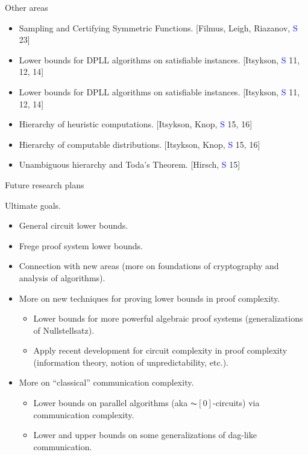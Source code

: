 \begin{frame}{Other areas}

    \begin{itemize}
        \item Sampling and Certifying Symmetric Functions. [Filmus, Leigh, Riazanov, \textcolor{blue}{S} 23]
        \item Lower bounds for DPLL algorithms on satisfiable instances. [Itsykson, \textcolor{blue}{S} 11, 12, 14]
        \item Lower bounds for DPLL algorithms on satisfiable instances. [Itsykson, \textcolor{blue}{S} 11, 12, 14]
        \item Hierarchy of heuristic computations. [Itsykson, Knop, \textcolor{blue}{S} 15, 16]
        \item Hierarchy of computable distributions. [Itsykson, Knop, \textcolor{blue}{S} 15, 16]
        \item Unambiguous hierarchy and Toda's Theorem. [Hirsch, \textcolor{blue}{S} 15]
    \end{itemize}
    
\end{frame}


\begin{frame}{Future research plans}

    Ultimate goals.
    \begin{itemize}
        \item General circuit lower bounds.
        \item Frege proof system lower bounds.
        \item Connection with new areas (more on foundations of cryptography and analysis of algorithms).
    \end{itemize}

    \pause
    \begin{itemize}
        \item More on new techniques for proving lower bounds in proof complexity.
            \begin{itemize}
                \item Lower bounds for more powerful algebraic proof systems (generalizations of
                    Nullstellsatz).
                \item Apply recent development for circuit complexity in proof complexity (information
                    theory, notion of unpredictability, etc.).
            \end{itemize}
        \item More on ``classical'' communication complexity.
            \begin{itemize}
                \item Lower bounds on parallel algorithms (aka $\AC[0]$-circuits) via communication
                    complexity.
                \item Lower and upper bounds on some generalizations of dag-like communication. 
            \end{itemize}
    \end{itemize}
    
\end{frame}


